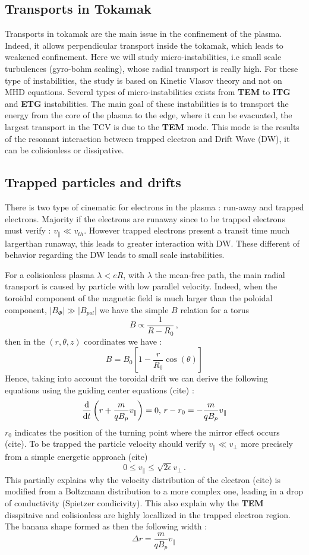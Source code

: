 \documentclass[11pt,a4paper]{report}
\begin{document}
\begin{multicols}{2}
    \section{Transports in Tokamak}
    Transports in tokamak are the main issue in the confinement of the plasma. Indeed, it allows perpendicular transport inside the tokamak, which leads to weakened confinement. Here we will study micro-instabilities, i.e small scale turbulences (gyro-bohm scaling), whose radial transport is really high. For these type of instabilities, the study is based on Kinetic Vlasov theory and not on MHD equations.
    Several types of micro-instabilities exists from \textbf{TEM} to \textbf{ITG} and \textbf{ETG} instabilities. The main goal of these instabilities is to transport the energy from the core of the plasma to the edge, where it can be evacuated, the largest transport in the TCV is due to the \textbf{TEM} mode. This mode is the results of the resonant interaction between trapped electron and Drift Wave (DW), it can be colisionless or dissipative.
    \subsection{Trapped particles and drifts}
    There is two type of cinematic for electrons in the plasma : run-away and trapped electrons. Majority if the electrons are runaway since to be trapped electrons must verify  : $v_\parallel \ll v_{th}$. However trapped electrons present a transit time much largerthan runaway, this leads to greater interaction with DW.
    These different of behavior regarding the DW leads to small scale instabilities.

    For a colisionless plasma $\lambda < eR$, with $\lambda$ the mean-free path, the main radial transport is caused by particle with low parallel velocity. Indeed, when the toroidal component of the magnetic field is much larger than the poloidal component, $\vert B_\Phi \vert \gg \vert B_{pol} \vert$ we have the simple $B$ relation for a torus $$B\propto \frac{1}{R-R_0} \, , $$ then in the $(r, \theta, z)$ coordinates we have  :
    $$B = B_0\left[1 - \frac{r}{R_0}\cos(\theta)\right]$$
    Hence, taking into account the toroidal drift we can derive the following equations using the guiding center equations (cite) :
    $$\dv{t}\left( r +\frac{m}{qB_p}v_\parallel\right) = 0 ,\, r - r_0 = -\frac{m}{qB_p}v_\parallel$$
    $r_0$ indicates the position of the turning point where the mirror effect occurs (cite). To be trapped the particle velocity should verify $v_\parallel \ll v_\perp$ more precisely from a simple energetic approach (cite) $$0 \leq v_\parallel \leq \sqrt{2\epsilon} v_\perp \,.$$ This partially explains why the velocity distribution of the electron (cite) is modified from a Boltzmann distribution to a more complex one, leading in a drop of conductivity (Spietzer condicivity). This also explain why the \textbf{TEM} disspitaive and colisionless are highly locallized in the trapped electron region. The banana shape formed as then the following width :
    $$\Delta r = \frac{m}{qB_p}v_\parallel \, $$


\end{multicols}
\end{document}
